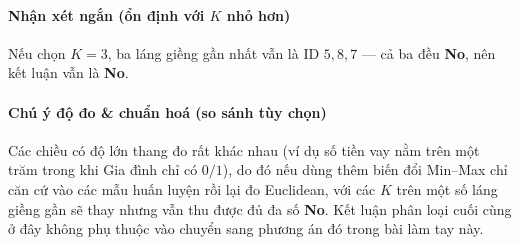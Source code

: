 \paragraph{Nhận xét ngắn (ổn định với $K$ nhỏ hơn)}
Nếu chọn $K=3$, ba láng giềng gần nhất vẫn là ID $5,8,7$ --- cả ba đều \textbf{No}, nên kết luận vẫn là \textbf{No}.

\paragraph{Chú ý độ đo \& chuẩn hoá (so sánh tùy chọn)}
Các chiều có độ lớn thang đo rất khác nhau (ví dụ số tiền vay nằm trên một trăm trong khi Gia đình chỉ có $0/1$), do đó nếu dùng thêm biến đổi Min--Max chỉ căn cứ vào các mẫu huấn luyện rồi lại đo Euclidean, với các $K$ trên một số láng giềng gần sẽ thay nhưng vẫn thu được đủ đa số \textbf{No}. Kết luận phân loại cuối cùng ở đây không phụ thuộc vào chuyển sang phương án đó trong bài làm tay này.
